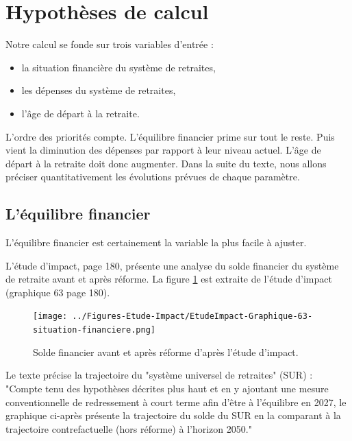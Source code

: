 \documentclass[10pt]{article}
\begin{document}

\section{Hypothèses de calcul}

Notre calcul se fonde sur trois variables d'entrée :
\begin{itemize}
\item la situation financière du système de retraites, 
\item les dépenses du système de retraites, 
\item l'âge de départ à la retraite. 
\end{itemize}

L'ordre des priorités compte. 
L'équilibre financier prime sur tout le reste. 
Puis vient la diminution des dépenses par rapport à leur niveau actuel. 
L'âge de départ à la retraite doit donc augmenter. 
Dans la suite du texte, nous allons préciser quantitativement 
les évolutions prévues de chaque paramètre. 


\subsection{L'équilibre financier}

L'équilibre financier est certainement la variable 
la plus facile à ajuster. 

L'étude d'impact, page 180, présente une analyse du solde financier du système de retraite 
avant et après réforme.
La figure \ref{fig-solde-etude-impact} est extraite de l'étude d'impact 
(graphique 63 page 180). 

\begin{figure}
\begin{center}
\texttt{[image: ../Figures-Etude-Impact/EtudeImpact-Graphique-63-situation-financiere.png]}
\end{center}
\caption{Solde financier avant et après réforme d'après l'étude d'impact.}
\label{fig-solde-etude-impact}
\end{figure}

Le texte précise la trajectoire du "système universel de retraites" (SUR) : 
"Compte tenu des hypothèses décrites plus haut 
et en y ajoutant une mesure conventionnelle de redressement à court 
terme afin d’être à l’équilibre en 2027, le graphique ci-après présente 
la trajectoire du solde du SUR en la comparant à la trajectoire 
contrefactuelle (hors réforme) à l’horizon 2050."
\end{document}
